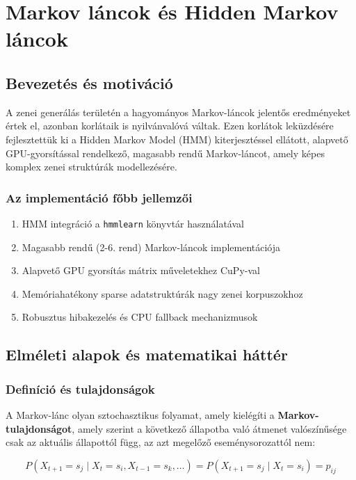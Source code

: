 \chapter{Markov láncok és Hidden Markov láncok}
\label{chap:markov}

\section{Bevezetés és motiváció}

A zenei generálás területén a hagyományos Markov-láncok jelentős eredményeket értek el, azonban korlátaik is nyilvánvalóvá váltak. Ezen korlátok leküzdésére fejlesztettük ki a Hidden Markov Model (HMM) kiterjesztéssel ellátott, alapvető GPU-gyorsítással rendelkező, magasabb rendű Markov-láncot, amely képes komplex zenei struktúrák modellezésére.

\subsection{Az implementáció főbb jellemzői}

\begin{enumerate}
    \item HMM integráció a \texttt{hmmlearn} könyvtár használatával
    \item Magasabb rendű (2-6. rend) Markov-láncok implementációja
    \item Alapvető GPU gyorsítás mátrix műveletekhez CuPy-val
    \item Memóriahatékony sparse adatstruktúrák nagy zenei korpuszokhoz
    \item Robusztus hibakezelés és CPU fallback mechanizmusok
\end{enumerate}

\section{Elméleti alapok és matematikai háttér}

\subsection{Definíció és tulajdonságok}

A Markov-lánc olyan sztochasztikus folyamat, amely kielégíti a \textbf{Markov-tulajdonságot}, amely szerint a következő állapotba való átmenet valószínűsége csak az aktuális állapottól függ, az azt megelőző eseménysorozattól nem:

\[
P(X_{t+1} = s_j \mid X_t = s_i, X_{t-1} = s_k, \dots) = P(X_{t+1} = s_j \mid X_t = s_i) = p_{ij}
\]

